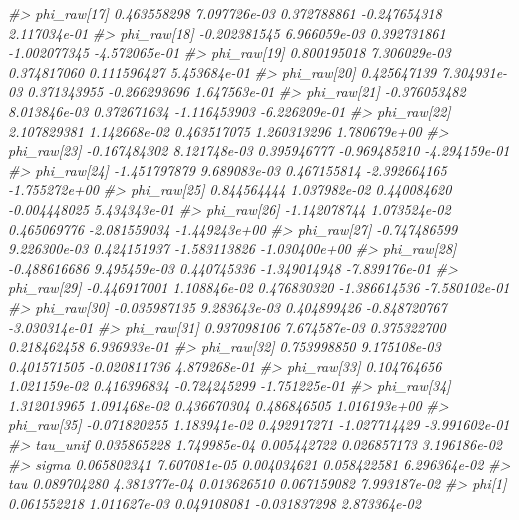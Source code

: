 \documentclass[
]{article}
\newenvironment{Shaded}{\begin{snugshade}}{\end{snugshade}}
\newcommand{\CommentTok}[1]{\textcolor[rgb]{0.56,0.35,0.01}{\textit{#1}}}
\begin{document}
\begin{Shaded}
\begin{Highlighting}[]
\CommentTok{\#\textgreater{} phi\_raw[17]   0.463558298 7.097726e{-}03 0.372788861  {-}0.247654318  2.117034e{-}01}
\CommentTok{\#\textgreater{} phi\_raw[18]  {-}0.202381545 6.966059e{-}03 0.392731861  {-}1.002077345 {-}4.572065e{-}01}
\CommentTok{\#\textgreater{} phi\_raw[19]   0.800195018 7.306029e{-}03 0.374817060   0.111596427  5.453684e{-}01}
\CommentTok{\#\textgreater{} phi\_raw[20]   0.425647139 7.304931e{-}03 0.371343955  {-}0.266293696  1.647563e{-}01}
\CommentTok{\#\textgreater{} phi\_raw[21]  {-}0.376053482 8.013846e{-}03 0.372671634  {-}1.116453903 {-}6.226209e{-}01}
\CommentTok{\#\textgreater{} phi\_raw[22]   2.107829381 1.142668e{-}02 0.463517075   1.260313296  1.780679e+00}
\CommentTok{\#\textgreater{} phi\_raw[23]  {-}0.167484302 8.121748e{-}03 0.395946777  {-}0.969485210 {-}4.294159e{-}01}
\CommentTok{\#\textgreater{} phi\_raw[24]  {-}1.451797879 9.689083e{-}03 0.467155814  {-}2.392664165 {-}1.755272e+00}
\CommentTok{\#\textgreater{} phi\_raw[25]   0.844564444 1.037982e{-}02 0.440084620  {-}0.004448025  5.434343e{-}01}
\CommentTok{\#\textgreater{} phi\_raw[26]  {-}1.142078744 1.073524e{-}02 0.465069776  {-}2.081559034 {-}1.449243e+00}
\CommentTok{\#\textgreater{} phi\_raw[27]  {-}0.747486599 9.226300e{-}03 0.424151937  {-}1.583113826 {-}1.030400e+00}
\CommentTok{\#\textgreater{} phi\_raw[28]  {-}0.488616686 9.495459e{-}03 0.440745336  {-}1.349014948 {-}7.839176e{-}01}
\CommentTok{\#\textgreater{} phi\_raw[29]  {-}0.446917001 1.108846e{-}02 0.476830320  {-}1.386614536 {-}7.580102e{-}01}
\CommentTok{\#\textgreater{} phi\_raw[30]  {-}0.035987135 9.283643e{-}03 0.404899426  {-}0.848720767 {-}3.030314e{-}01}
\CommentTok{\#\textgreater{} phi\_raw[31]   0.937098106 7.674587e{-}03 0.375322700   0.218462458  6.936933e{-}01}
\CommentTok{\#\textgreater{} phi\_raw[32]   0.753998850 9.175108e{-}03 0.401571505  {-}0.020811736  4.879268e{-}01}
\CommentTok{\#\textgreater{} phi\_raw[33]   0.104764656 1.021159e{-}02 0.416396834  {-}0.724245299 {-}1.751225e{-}01}
\CommentTok{\#\textgreater{} phi\_raw[34]   1.312013965 1.091468e{-}02 0.436670304   0.486846505  1.016193e+00}
\CommentTok{\#\textgreater{} phi\_raw[35]  {-}0.071820255 1.183941e{-}02 0.492917271  {-}1.027714429 {-}3.991602e{-}01}
\CommentTok{\#\textgreater{} tau\_unif      0.035865228 1.749985e{-}04 0.005442722   0.026857173  3.196186e{-}02}
\CommentTok{\#\textgreater{} sigma         0.065802341 7.607081e{-}05 0.004034621   0.058422581  6.296364e{-}02}
\CommentTok{\#\textgreater{} tau           0.089704280 4.381377e{-}04 0.013626510   0.067159082  7.993187e{-}02}
\CommentTok{\#\textgreater{} phi[1]        0.061552218 1.011627e{-}03 0.049108081  {-}0.031837298  2.873364e{-}02}

\end{Highlighting}
\end{Shaded}
\end{document}
